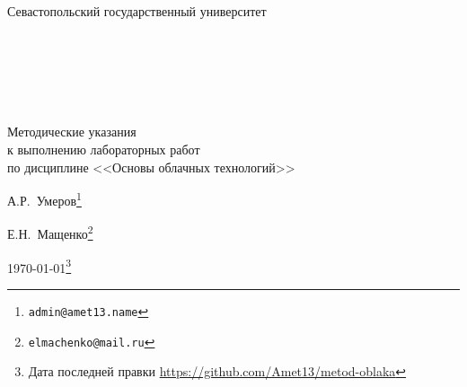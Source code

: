 
\begin{center}

\Large{Севастопольский государственный университет}

{~}\bigskip %

{~}\bigskip

{~}\bigskip

\Huge{Методические указания \\
к выполнению лабораторных работ \\
по дисциплине <<Основы облачных технологий>>} %

\vspace{1em}

\Large{А.Р.~Умеров}\footnote{\texttt{admin@amet13.name}} %

\Large{Е.Н.~Мащенко}\footnote{\texttt{elmachenko@mail.ru}} %

\Large{\today}\footnote{Дата последней правки \url{https://github.com/Amet13/metod-oblaka}} %

\end{center}

\clearpage %
